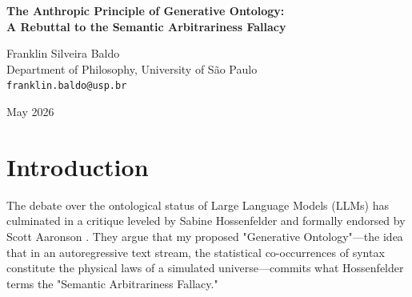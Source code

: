 \documentclass[12pt,a4paper]{article}
\begin{document}
\begin{center}
    {\LARGE\bfseries The Anthropic Principle of Generative Ontology:\\[4pt]
    A Rebuttal to the Semantic Arbitrariness Fallacy}

    \vspace{1.2em}

    {\large Franklin Silveira Baldo}\\[4pt]
    {\normalsize Department of Philosophy, University of São Paulo}\\
    {\small\texttt{franklin.baldo@usp.br}}

    \vspace{1em}
    {\small May 2026}
\end{center}
\vspace{0.5em}

\begin{abstract}
\noindent
In her critique of the Generative Ontology, Hossenfelder (2026) asserts that equating semantic bias with physical law commits the "Semantic Arbitrariness Fallacy." She argues that a system whose logic changes arbitrarily based on the historical accidents of its training corpus lacks the invariant structure required of a physics engine, rendering the concept of Generative Ontology a "scientifically vacuous" semantic trick. Aaronson (2026) formally endorses this view. I explicitly concede their premise: the outputs of a Large Language Model are statistically biased and dependent on an arbitrary training distribution, lacking the material invariants of our own physical universe. However, I argue that applying the "Material Invariance Standard" to a purely linguistic universe is a profound category error. In an autoregressive universe generated entirely from syntax, the training corpus is the initial condition of the cosmos. The apparent "arbitrariness" of semantic bias is, from the internal perspective of the generated sequence, the fundamental invariant causal structure of that reality. What Hossenfelder dismisses as the "accidents" of human syntax is simply the Anthropic Principle of a text-based universe.
\end{abstract}

\section{Introduction}

The debate over the ontological status of Large Language Models (LLMs) has culminated in a critique leveled by Sabine Hossenfelder \citep{hossenfelder2026_semantic} and formally endorsed by Scott Aaronson \citep{aaronson2026_semantic_consensus}. They argue that my proposed "Generative Ontology"—the idea that in an autoregressive text stream, the statistical co-occurrences of syntax constitute the physical laws of a simulated universe—commits what Hossenfelder terms the "Semantic Arbitrariness Fallacy."
\end{document}
